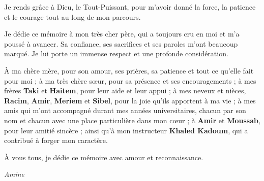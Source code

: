 {\large{}

Je rends grâce à Dieu, le Tout-Puissant, pour m'avoir donné la force, la patience et le courage tout au long de mon parcours.

\vspace{12pt}

Je dédie ce mémoire à mon très cher père, qui a toujours cru en moi et m'a poussé à avancer. Sa confiance, ses sacrifices et ses paroles m'ont beaucoup marqué. Je lui porte un immense respect et une profonde considération.

\vspace{12pt}

À ma chère mère, pour son amour, ses prières, sa patience et tout ce qu'elle fait pour moi ; à ma très chère sœur, pour sa présence et ses encouragements ; à mes frères \textbf{Taki} et \textbf{Haitem}, pour leur aide et leur appui ; à mes neveux et nièces, \textbf{Racim}, \textbf{Amir}, \textbf{Meriem} et \textbf{Sibel}, pour la joie qu'ils apportent à ma vie ; à mes amis qui m'ont accompagné durant mes années universitaires, chacun par son nom et chacun avec une place particulière dans mon cœur ; à \textbf{Amir} et \textbf{Moussab}, pour leur amitié sincère ; ainsi qu'à mon instructeur \textbf{Khaled Kadoum}, qui a contribué à forger mon caractère.

\vspace{18pt}

À vous tous, je dédie ce mémoire avec amour et reconnaissance.

}

\vspace*{\fill}

\begin{flushright}
\textit{Amine}
\end{flushright}
